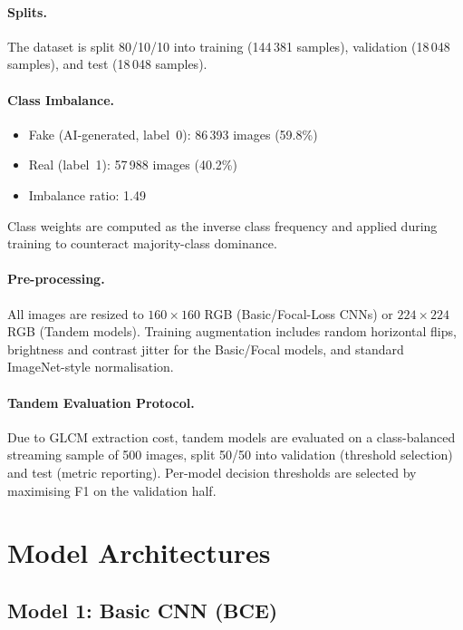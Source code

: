 \documentclass[10pt,twocolumn]{article}
\begin{document}
\paragraph{Splits.}
The dataset is split 80/10/10 into training (144\,381 samples),
validation (18\,048 samples), and test (18\,048 samples).

\paragraph{Class Imbalance.}
\begin{itemize}[noitemsep,leftmargin=*]
  \item Fake (AI-generated, label~0): 86\,393 images (59.8\%)
  \item Real (label~1): 57\,988 images (40.2\%)
  \item Imbalance ratio: 1.49
\end{itemize}
Class weights are computed as the inverse class frequency and applied
during training to counteract majority-class dominance.

\paragraph{Pre-processing.}
All images are resized to $160\times160$ RGB (Basic/Focal-Loss CNNs)
or $224\times224$ RGB (Tandem models).
Training augmentation includes random horizontal flips, brightness and
contrast jitter for the Basic/Focal models, and standard ImageNet-style
normalisation.

\paragraph{Tandem Evaluation Protocol.}
Due to GLCM extraction cost, tandem models are evaluated on a
class-balanced streaming sample of 500 images, split 50/50 into
validation (threshold selection) and test (metric reporting).
Per-model decision thresholds are selected by maximising F1 on
the validation half.

\section{Model Architectures}
\label{sec:arch}

\subsection{Model 1: Basic CNN (BCE)}
\label{ssec:basic}
\end{document}
